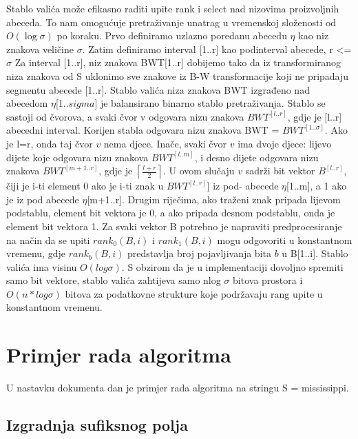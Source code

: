 \documentclass[a4paper,12pt]{article}
\begin{document}
Stablo valića može efikasno raditi upite rank i select nad nizovima proizvoljnih abeceda. To nam omogućuje pretraživanje unatrag u vremenskoj složenosti od  $O(\log\sigma)$ po koraku.
Prvo definiramo uzlazno poredanu abecedu $\eta$ kao niz znakova veličine $\sigma $.  
Zatim definiramo interval [1..r] kao podinterval abecede, r <= $\sigma$
Za interval [1..r], niz znakova BWT[1..r] dobijemo tako da iz transformiranog niza znakova od S uklonimo sve znakove iz B-W transformacije koji ne pripadaju segmentu abecede [1..r]. Stablo valića niza znakova BWT izgrađeno nad abecedom $\eta$[1..$sigma$] je balansirano binarno stablo pretraživanja. Stablo se sastoji od čvorova, a svaki čvor v odgovara nizu znakova $BWT^{[l..r]}$, gdje je [l..r] abecedni interval. Korijen stabla odgovara nizu znakova BWT = $BWT^{[1..\sigma]}$. Ako je l=r, onda taj čvor $v$ nema djece. Inače, svaki čvor $v$ ima dvoje djece: lijevo dijete koje odgovara nizu znakova $BWT^{[l..m]}$, i desno dijete odgovara nizu znakova $BWT^{[m+1..r]}$, gdje je $\left \lceil{\frac{l+r}{2}}\right \rceil$. U ovom slučaju $v$ sadrži bit vektor $B^{[l..r]}$, čiji je i-ti element 0 ako je i-ti znak u $BWT^{[l..r]}]$ iz pod- abecede $\eta$[1..m], a 1 ako je iz pod abecede $\eta$[m+1..r]. Drugim riječima, ako traženi znak pripada lijevom podstablu, element bit vektora je 0, a ako pripada desnom podstablu, onda je element bit vektora 1. Za svaki vektor B potrebno je napraviti predprocesiranje na način da se upiti $rank_0(B,i)$ i $rank_1(B,i)$ mogu odgovoriti u konstantnom vremenu, gdje $rank_b(B,i)$ predstavlja broj pojavljivanja bita $b$ u B[1..i]. Stablo valića ima visinu $O(log\sigma)$. S obzirom da je u implementaciji dovoljno spremiti samo bit vektore, stablo valića zahtijeva samo nlog $\sigma$ bitova prostora i $O(n*log\sigma)$ bitova za podatkovne strukture koje podržavaju rang upite u konstantnom vremenu.  

\section{Primjer rada algoritma}
U nastavku dokumenta dan je primjer rada algoritma na stringu S = mississippi.

\subsection{Izgradnja sufiksnog polja}
\end{document}
